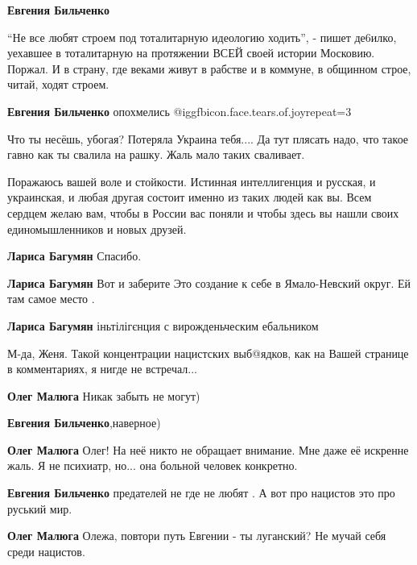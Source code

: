 \begin{itemize}
\begin{itemize}
\textbf{Евгения Бильченко} 

\enquote{Не все любят строем под тоталитарную идеологию ходить}, - пишет де6илко,
уехавшее в тоталитарную на протяжении ВСЕЙ своей истории Московию. Поржал. И в
страну, где веками живут в рабстве и в коммуне, в общинном строе, читай, ходят
строем.

\textbf{Евгения Бильченко} опохмелись @igg{fbicon.face.tears.of.joy}{repeat=3} 


Что ты несёшь, убогая? Потеряла Украина тебя.... Да тут плясать надо, что такое
гавно как ты свалила на рашку. Жаль мало таких сваливает.

\end{itemize} %


Поражаюсь вашей воле и стойкости. Истинная интеллигенция и русская, и
украинская, и любая другая состоит именно из таких людей как вы. Всем сердцем
желаю вам, чтобы в России вас поняли и чтобы здесь вы нашли своих
единомышленников и новых друзей.

\begin{itemize} %
\textbf{Лариса Багумян} Спасибо.

\textbf{Лариса Багумян} Вот и заберите Это создание к себе в Ямало-Невский округ. Ей там самое место .

\textbf{Лариса Багумян} іньтілігєнция с вирожденьческим ебальником
\end{itemize} %


М-да, Женя. Такой концентрации нацистских выб@ядков, как на Вашей странице в
комментариях, я нигде не встречал...

\begin{itemize} %
\textbf{Олег Малюга} Никак забыть не могут)

\textbf{Евгения Бильченко},наверное)

\textbf{Олег Малюга} Олег! На неё никто не обращает внимание. Мне даже её искренне жаль. Я не психиатр, но... она больной человек конкретно.

\textbf{Евгения Бильченко} предателей не где не любят . А вот про нацистов это про руський мир.

\textbf{Олег Малюга} Олежа, повтори путь Евгении - ты луганский? Не мучай себя среди нацистов.


\end{itemize}
\end{itemize}
